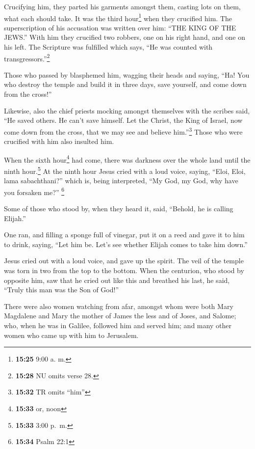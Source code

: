  Crucifying him, they parted his garments amongst them,
casting lots on them, what each should take.  It was the
third hour\footnote{\textbf{15:25} 9:00 a. m.} when they crucified him.
 The superscription of his accusation was written over
him: ``THE KING OF THE JEWS.''  With him they crucified
two robbers, one on his right hand, and one on his left. 
The Scripture was fulfilled which says, ``He was counted with
transgressors.''\footnote{\textbf{15:28} NU omits verse 28.}

 Those who passed by blasphemed him, wagging their heads
and saying, ``Ha! You who destroy the temple and build it in three days,
 save yourself, and come down from the cross!''

 Likewise, also the chief priests mocking amongst
themselves with the scribes said, ``He saved others. He can't save
himself.  Let the Christ, the King of Israel, now come
down from the cross, that we may see and believe him.''\footnote{\textbf{15:32}
  TR omits ``him''} Those who were crucified with him also insulted him.

 When the sixth hour\footnote{\textbf{15:33} or, noon}
had come, there was darkness over the whole land until the ninth
hour.\footnote{\textbf{15:33} 3:00 p.~m.}  At the ninth
hour Jesus cried with a loud voice, saying, ``Eloi, Eloi, lama
sabachthani?'' which is, being interpreted, ``My God, my God, why have
you forsaken me?'' \footnote{\textbf{15:34} Psalm 22:1}

 Some of those who stood by, when they heard it, said,
``Behold, he is calling Elijah.''

 One ran, and filling a sponge full of vinegar, put it on
a reed and gave it to him to drink, saying, ``Let him be. Let's see
whether Elijah comes to take him down.''

 Jesus cried out with a loud voice, and gave up the
spirit.  The veil of the temple was torn in two from the
top to the bottom.  When the centurion, who stood by
opposite him, saw that he cried out like this and breathed his last, he
said, ``Truly this man was the Son of God!''

 There were also women watching from afar, amongst whom
were both Mary Magdalene and Mary the mother of James the less and of
Joses, and Salome;  who, when he was in Galilee, followed
him and served him; and many other women who came up with him to
Jerusalem.

